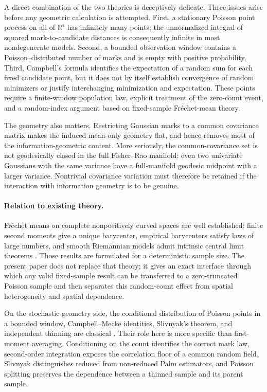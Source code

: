 \documentclass[11pt,a4paper]{article}
\theoremstyle{remark}
\newcommand{\R}{\mathbb R}
\begin{document}
A direct combination of the two theories is deceptively delicate.  Three issues arise before any geometric calculation is attempted.  First, a stationary Poisson point process on all of \(\R^s\) has infinitely many points; the unnormalized integral of squared mark-to-candidate distances is consequently infinite in most nondegenerate models.  Second, a bounded observation window contains a Poisson--distributed number of marks and is empty with positive probability.  Third, Campbell's formula identifies the expectation of a random sum for each fixed candidate point, but it does not by itself establish convergence of random minimizers or justify interchanging minimization and expectation.  These points require a finite-window population law, explicit treatment of the zero-count event, and a random-index argument based on fixed-sample Fr\'echet-mean theory.

The geometry also matters.  Restricting Gaussian marks to a common covariance matrix makes the induced mean-only geometry flat, and hence removes most of the information-geometric content.  More seriously, the common-covariance set is not geodesically closed in the full Fisher--Rao manifold: even two univariate Gaussians with the same variance have a full-manifold geodesic midpoint with a larger variance.  Nontrivial covariance variation must therefore be retained if the interaction with information geometry is to be genuine.

\paragraph{Relation to existing theory.}

Fr\'echet means on complete nonpositively curved spaces are well established: finite second moments give a unique barycenter, empirical barycenters satisfy laws of large numbers, and smooth Riemannian models admit intrinsic central limit theorems \cite{sturm2003,bhattacharya2003,bhattacharya2005,pennec2006}.  Those results are formulated for a deterministic sample size.  The present paper does not replace that theory; it gives an exact interface through which any valid fixed-sample result can be transferred to a zero-truncated Poisson sample and then separates this random-count effect from spatial heterogeneity and spatial dependence.

On the stochastic-geometry side, the conditional distribution of Poisson points in a bounded window, Campbell--Mecke identities, Slivnyak's theorem, and independent thinning are classical \cite{kingman1993,lastpenrose2017,chiu2013}.  Their role here is more specific than first-moment averaging.  Conditioning on the count identifies the correct mark law, second-order integration exposes the correlation floor of a common random field, Slivnyak distinguishes reduced from non-reduced Palm estimators, and Poisson splitting preserves the dependence between a thinned sample and its parent sample.
\end{document}
